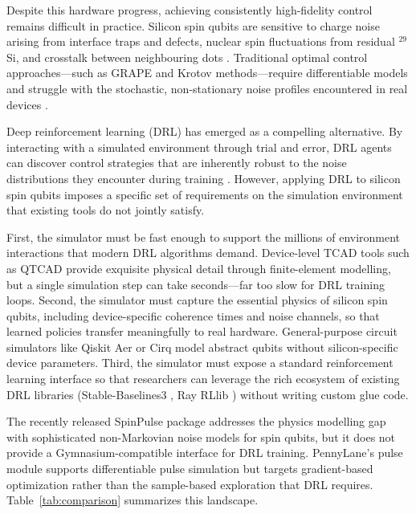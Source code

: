 \documentclass[preprint,12pt, a4paper]{elsarticle}
\begin{document}
Despite this hardware progress, achieving consistently high-fidelity control remains difficult in practice. Silicon spin qubits are sensitive to charge noise arising from interface traps and defects, nuclear spin fluctuations from residual $^{29}$Si, and crosstalk between neighbouring dots \cite{yoneda2018quantum, struck2020low, connors2022charge}. Traditional optimal control approaches---such as GRAPE and Krotov methods---require differentiable models and struggle with the stochastic, non-stationary noise profiles encountered in real devices \cite{khaneja2005optimal}.

Deep reinforcement learning (DRL) has emerged as a compelling alternative. By interacting with a simulated environment through trial and error, DRL agents can discover control strategies that are inherently robust to the noise distributions they encounter during training \cite{niu2019universal, fosel2018reinforcement, porotti2019coherent, an2019deep}. However, applying DRL to silicon spin qubits imposes a specific set of requirements on the simulation environment that existing tools do not jointly satisfy.

First, the simulator must be fast enough to support the millions of environment interactions that modern DRL algorithms demand. Device-level TCAD tools such as QTCAD \cite{qtcad2023} provide exquisite physical detail through finite-element modelling, but a single simulation step can take seconds---far too slow for DRL training loops. Second, the simulator must capture the essential physics of silicon spin qubits, including device-specific coherence times and noise channels, so that learned policies transfer meaningfully to real hardware. General-purpose circuit simulators like Qiskit Aer \cite{qiskit2024} or Cirq \cite{cirq2018} model abstract qubits without silicon-specific device parameters. Third, the simulator must expose a standard reinforcement learning interface so that researchers can leverage the rich ecosystem of existing DRL libraries (Stable-Baselines3 \cite{raffin2021stable}, Ray RLlib \cite{liang2018rllib}) without writing custom glue code.

The recently released SpinPulse package \cite{vermersch2026spinpulse} addresses the physics modelling gap with sophisticated non-Markovian noise models for spin qubits, but it does not provide a Gymnasium-compatible interface for DRL training. PennyLane's pulse module \cite{bergholm2018pennylane} supports differentiable pulse simulation but targets gradient-based optimization rather than the sample-based exploration that DRL requires. Table~\ref{tab:comparison} summarizes this landscape.
\end{document}
